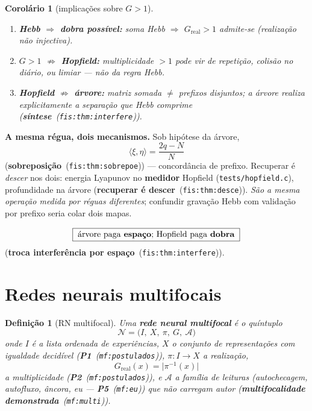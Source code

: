 \documentclass[11pt,a4paper]{article}
\newcommand{\code}[1]{\texttt{\small #1}}
\newcommand{\abs}[1]{\lvert #1\rvert}
\newcommand{\fis}[2]{\textbf{#2}~\textnormal{(\code{#1})}}
\newcommand{\mf}[2]{\textbf{#2}~\textnormal{(\code{mf:#1})}}
\newtheorem{definicao}[teorema]{Definição}
\newtheorem{corolario}[teorema]{Corolário}
\begin{document}
\begin{corolario}[implicações sobre $G>1$]\label{redes:cor-mp-hopfield}
\begin{enumerate}\itemsep3pt
\item \textbf{Hebb $\Rightarrow$ dobra possível:} soma Hebb $\Rightarrow$
$G_{\mathrm{real}}>1$ \emph{admite-se} (realização não injectiva).
\item \textbf{$G>1$ $\not\Rightarrow$ Hopfield:} multiplicidade $>1$ pode vir de
repetição, colisão no diário, ou limiar --- não da regra Hebb.
\item \textbf{Hopfield $\not\Rightarrow$ árvore:} matriz somada $\neq$ prefixos
disjuntos; \emph{a árvore realiza explicitamente a separação que Hebb comprime}
(\fis{fis:thm:interfere}{síntese}).
\end{enumerate}
\end{corolario}

\medskip\noindent\textbf{A mesma régua, dois mecanismos.} Sob hipótese da árvore,
\[
\langle\xi,\eta\rangle=\frac{2q-N}{N}
\]
(\fis{fis:thm:sobrepoe}{sobreposição}) --- concordância de prefixo. Recuperar é
\emph{descer} nos dois: energia Lyapunov no \textbf{medidor} Hopfield
(\code{tests/hopfield.c}), profundidade na árvore
(\fis{fis:thm:desce}{recuperar é descer}). \emph{São a mesma operação medida por
réguas diferentes}; confundir gravação Hebb com validação por prefixo seria colar
dois mapas.

\[
\boxed{\;\text{árvore paga \textbf{espaço}; Hopfield paga \textbf{dobra}}\;}
\]
(\fis{fis:thm:interfere}{troca interferência por espaço}).

\section{Redes neurais multifocais}\label{redes:def}

\begin{definicao}[RN multifocal]\label{redes:def-rnm}
Uma \textbf{rede neural multifocal} é o quíntuplo
\[
\mathcal{N}=\bigl(I,\ X,\ \pi,\ G,\ \mathcal{A}\bigr)
\]
onde $I$ é a lista ordenada de experiências, $X$ o conjunto de representações com
igualdade decidível (\mf{postulados}{P1}), $\pi\colon I\to X$ a realização,
\[
G_{\mathrm{real}}(x)=\abs{\pi^{-1}(x)}
\]
a multiplicidade (\mf{postulados}{P2}), e $\mathcal{A}$ a
família de leituras (autochecagem, autofluxo, âncora, eu --- \mf{eu}{P5}) que
\emph{não} carregam autor (\mf{multi}{multifocalidade demonstrada}).
\end{definicao}
\end{document}
